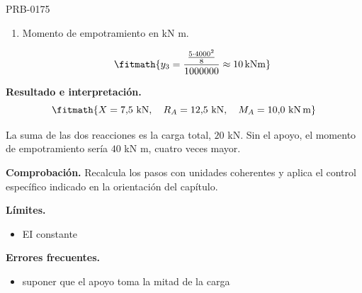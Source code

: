 \begin{studiumworked}{PRB-0175}
\begin{enumerate}
\[\fitmath{y_{2}=\frac{5\cdot 5\cdot 4000}{8}\approx 12500\,\mathrm{N}}\]

\item Momento de empotramiento en kN m.

\[\fitmath{y_{3}=\frac{\frac{5\cdot {4000}^{2}}{8}}{1000000}\approx 10\,\mathrm{kN m}}\]

\end{enumerate}

\textbf{Resultado e interpretación.}\[\fitmath{X = 7{,}5\ \mathrm{kN},\quad R_A = 12{,}5\ \mathrm{kN},\quad M_A = 10{,}0\ \mathrm{kN\,m}}\]

La suma de las dos reacciones es la carga total, $20$ kN. Sin el apoyo, el momento de empotramiento sería $40$ kN m, cuatro veces mayor.

\par\textbf{Comprobación.} Recalcula los pasos con unidades coherentes y aplica el control específico indicado en la orientación del capítulo.

\textbf{Límites.}\begin{itemize}\item EI constante\end{itemize}

\textbf{Errores frecuentes.}\begin{itemize}\item suponer que el apoyo toma la mitad de la carga\end{itemize}

\end{studiumworked}

\Needspace{.3\textheight}

